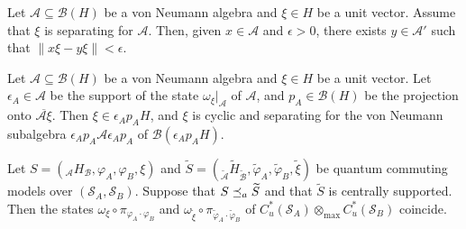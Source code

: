 \documentclass[10pt,a4paper]{amsart}
\newcommand{\cl}[1]{\mathcal{#1}}
\providecommand{\wt}[1]{\widetilde{#1}}
\begin{document}
\begin{lemma}\label{uptoeps}
    Let $\cl A\subseteq\cl B(H)$ be a von Neumann algebra and 
    $\xi\in H$ be a unit vector. 
    Assume that $\xi$ is separating for $\cl A$.
    Then, given $x\in\cl A$ and $\epsilon > 0$, there exists $y\in\cl A'$ such that $\|x\xi-y\xi\|<\epsilon$. 
\end{lemma}

\begin{lemma}\label{sep_cycl}
 Let $\cl A \subseteq \cl B(H)$ be a von Neumann algebra and  $\xi\in H$
 be a unit vector. Let  $\epsilon_A\in \cl A$ be the support 
 of the state $\omega_\xi|_{\cl A}$ of $\cl A$, 
 and $p_A\in \cl B(H)$ be the projection onto 
 $\overline{\cl A\xi}$.  Then $\xi \in \epsilon_Ap_AH$, and 
 $\xi$ is cyclic and separating for the von Neumann subalgebra 
 $\epsilon_Ap_A\cl A\epsilon_Ap_A$ of $\cl B(\epsilon_Ap_AH)$. 
\end{lemma}

\begin{lemma}\label{p_apextends}
 Let $S = (_{\cl A}H_{\cl B}, \varphi_A, \varphi_B, \xi)$ and
 $\wt{S} = (_{\wt{\cl A}}\wt{H}_{\wt{\cl B}}, \wt{\varphi}_A, 
 \wt{\varphi}_B, \wt{\xi})$ be quantum commuting models
 over $(\cl S_A,\cl S_B)$. 
 Suppose that $S\preceq_{\rm a} \wt{S}$ and that $\wt{S}$ is centrally supported. 
 Then the states 
 $\omega_\xi\circ\pi_{\varphi_A\cdot\varphi_B}$
 and $\omega_{\wt{\xi}}\circ\pi_{\wt{\varphi}_A\cdot\wt{\varphi}_B}$ of $C^*_u(\cl S_A)\otimes_{\max} C^*_u(\cl S_B)$ coincide. 
\end{lemma}
\end{document}
